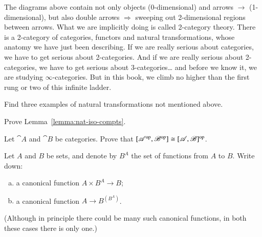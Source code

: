 \begin{remarks}
The diagrams above contain not only objects (0-dimensional) and arrows
$\to$ (1-dimensional), but also double arrows $\Rightarrow$ sweeping out
2-dimensional regions between arrows.  What we are implicitly doing is
called 2-category%
%
%
theory.  There is a 2-category%
%
%
of categories, functors and natural transformations, whose anatomy we have
just been describing.  If we are really serious about categories, we have
to get serious about 2-categories.  And if we are really serious about
2-categories, we have to get serious about 3-categories\ldots%
%
%
and before we know it, we are studying $\infty$-categories.%
%
%
But in this book, we climb no higher than the first rung or two of this
infinite ladder.%
%
%

\end{remarks}


\exs


\begin{question}
Find three examples of natural transformations not mentioned above.
\end{question}


\begin{question}
\label{ex:nat-iso-compts}
Prove Lemma~\ref{lemma:nat-iso-compts}.
\end{question}


\begin{question}
Let $\cat{A}$ and $\cat{B}$ be categories.  Prove that
$[\mathscr{A}^{\mathrm{op}},\mathscr{B}^{\mathrm{op}}] \cong [\mathscr{A},\mathscr{B}]^{\mathrm{op}}$.
\end{question}


\begin{question}
Let $A$ and $B$ be sets, and denote by $B^A$ the set of functions from $A$
to $B$.  Write down:
%
\begin{enumerate}[(b)]
\item
a canonical function $A \times B^A \to B$;%
%
%

\item
a canonical function $A \to B^{(B^A)}$.
\end{enumerate}
%
(Although in principle there could be many such canonical functions,
in both these cases there is only one.)
\end{question}


